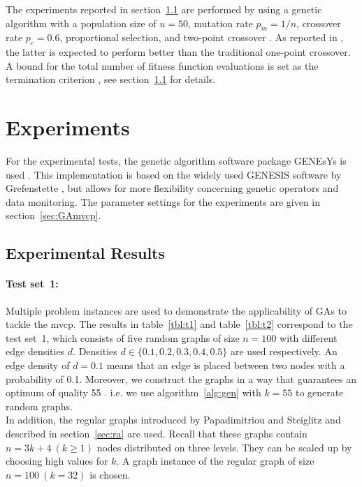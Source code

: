 \documentclass[12pt]{article}
\begin{document}
The experiments reported in section~\ref{sec:er} are performed
by using a genetic algorithm with a population size of
$u = 50$, mutation rate $p_m = 1/n$, crossover rate
$p_c = 0.6$, proportional selection, and two-point crossover \cite{mvcp-back}.
As reported in \cite{2:mvcp, 12:mvcp}, the latter is expected to perform
better than the traditional one-point crossover.
A bound for the total number
of fitness function evaluations is set as the termination
criterion \cite{mvcp-back}, see section~\ref{sec:er} for details.


\section{Experiments}
For the experimental tests,
the genetic algorithm software package GENEsYs is used \cite{1:misp}.
This implementation is based on the widely used GENESIS software by Grefenstette \cite{5:mvcp},
but allows for more  flexibility concerning genetic operators and data monitoring.
The parameter settings for the experiments are
given in section~\ref{sec:GAmvcp}.


\subsection{Experimental Results}
\label{sec:er}

\paragraph{Test set~1:}
Multiple problem instances are used to demonstrate the applicability of GAs to tackle the mvcp.
The results in table~\ref{tbl:t1}
and table~\ref{tbl:t2} correspond to the test set~1, which consists of
five random graphs of size $n = 100$ with different
edge densities $d$.
Densities $d \in \{0.1, 0.2, 0.3, 0.4, 0.5\}$ are used respectively.
An edge density of $d = 0.1$ means that an edge is placed between two
nodes with a probability of 0.1.
Moreover, we construct the graphs in a way that guarantees an optimum of quality 55 \cite{mvcp-back}.
i.e. we use algorithm~\ref{alg:gen} with $k = 55$ to generate random graphs.\\
In addition, the regular graphs introduced by
Papadimitriou and Steiglitz and described in section~\ref{sec:ra} are used.
Recall that these graphs contain $n=3k+4 \ (k \geq 1)$ nodes distributed on three levels.
They can be scaled up by choosing high values for $k$.
A graph instance of the regular graph of size $n = 100 \  (k=32)$ is chosen.
\end{document}
